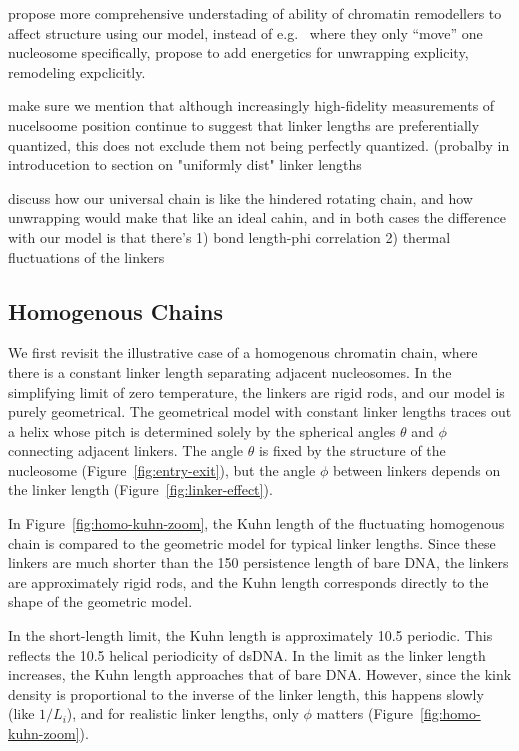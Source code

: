 \documentclass[%
 reprint,
superscriptaddress,
showpacs,preprintnumbers,
 amsmath,amssymb,
 aps,
 prl,
]{revtex4-1}
\begin{document}
propose more comprehensive understading of ability of chromatin
remodellers to affect structure using our model, instead of
e.g.~\cite{muller2014} where they only ``move'' one nucleosome
specifically, propose to add energetics for unwrapping explicity, remodeling
expclicitly.

make sure we mention that although increasingly high-fidelity measurements
of nucelsoome position continue to suggest that linker lengths are
preferentially quantized, this does not exclude them not being perfectly
quantized. (probalby in introducetion to section on "uniformly dist" linker
lengths

discuss how our universal chain is like the hindered rotating chain, and
how unwrapping would make that like an ideal cahin, and in both cases the
difference with our model is that there's 1) bond length-phi correlation 2)
thermal fluctuations of the linkers


\subsection{\label{sec:homo-chain}Homogenous Chains}

We first revisit the illustrative case of a homogenous chromatin chain, where
    there is a constant linker length separating adjacent nucleosomes.
In the simplifying limit of zero temperature, the linkers are rigid rods, and
    our model is purely geometrical.
The geometrical model with constant linker lengths traces out a helix whose
    pitch is determined solely by the spherical angles $\theta$ and $\phi$
    connecting adjacent linkers.
The angle $\theta$ is fixed by the structure of the nucleosome
    (Figure~\ref{fig:entry-exit}), but the angle $\phi$ between linkers depends
    on the linker length (Figure~\ref{fig:linker-effect}).

In Figure~\ref{fig:homo-kuhn-zoom}, the Kuhn length of the
    fluctuating homogenous chain is compared to the geometric model for
    typical linker lengths.
Since these linkers are much shorter than the \SI{150}{\basepair} persistence
    length of bare DNA, the linkers are approximately rigid rods, and the Kuhn
    length corresponds directly to the shape of the geometric model.

In the short-length limit, the Kuhn length is approximately \SI{10.5}{\basepair}
    periodic.
This reflects the \SI{10.5}{\basepair} helical periodicity of dsDNA.\@
In the limit as the linker length increases, the Kuhn length approaches that of
    bare DNA.\@
However, since the kink density is proportional to the inverse of the linker
    length, this happens slowly (like $1/L_i$), and for realistic linker
    lengths, only $\phi$ matters (Figure~\ref{fig:homo-kuhn-zoom}).
\end{document}
